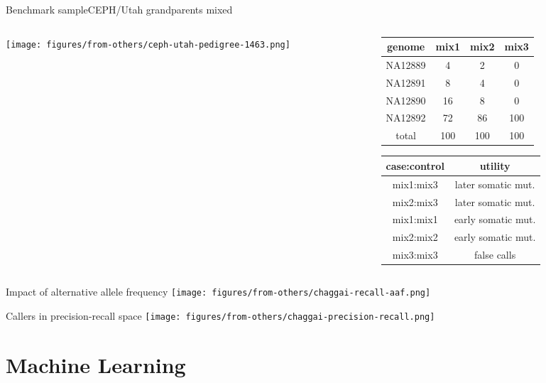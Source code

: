 \documentclass{beamer}
\begin{document}
\begin{frame}[label=benchmark]{Benchmark sample}{CEPH/Utah grandparents mixed}
\begin{center}
\begin{columns}[t]
\begin{column}{0.5\textwidth}

\texttt{[image: figures/from-others/ceph-utah-pedigree-1463.png]}
\end{column}

\begin{column}{0.5\textwidth}

\small
{
\begin{tabular}{cccc}
genome & mix1 & mix2 & mix3\\
\hline
NA12889 & 4 & 2 & 0\\
NA12891 & 8 & 4 & 0\\
NA12890 & 16 & 8 & 0\\
NA12892 & 72 & 86 & 100\\
\hline
total & 100 & 100 & 100\\
\end{tabular}
}
\vfill
{
\begin{tabular}{cc}
case:control & utility \\
\hline
\hline
mix1:mix3 & later somatic mut. \\
mix2:mix3 & later somatic mut. \\
\hline
mix1:mix1 & early somatic mut. \\
mix2:mix2 & early somatic mut. \\
\hline
mix3:mix3 & false calls \\
\end{tabular}
}
\end{column}
\end{columns}
\end{center}
\end{frame}

\begin{frame}{Impact of alternative allele frequency}
\texttt{[image: figures/from-others/chaggai-recall-aaf.png]}
\end{frame}

\begin{frame}[label=precrecall]{Callers in precision-recall space}
\texttt{[image: figures/from-others/chaggai-precision-recall.png]}
\end{frame}

\section{Machine Learning}
\end{document}
